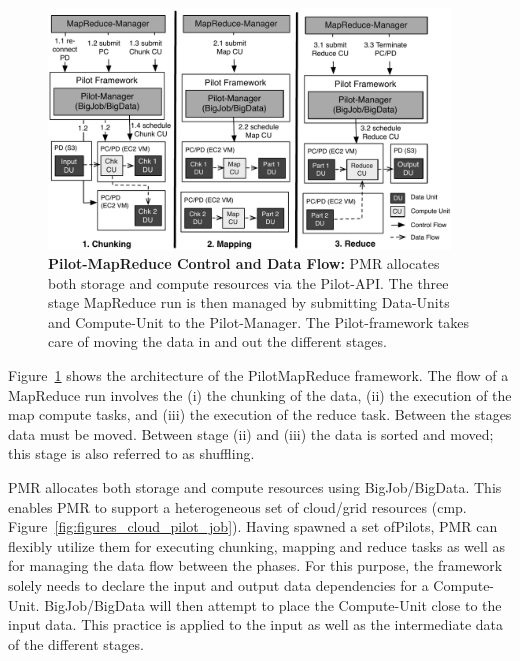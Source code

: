 \documentclass[times]{cpeauth}
\newcommand{\pilot}{Pilot\xspace}
\newcommand{\pilots}{Pilots\xspace}
\newcommand{\pilotmapreduce}{PilotMapReduce\xspace}
\newcommand{\computeunit}{Compute-Unit\xspace}
\newcommand{\dataunits}{Data-Units\xspace}
\begin{document}
\begin{figure}[t]
	\centering
    \includegraphics[width=0.95\textwidth]{figures/pmr_clouds_flow.pdf}
    \caption{\textbf{Pilot-MapReduce Control and Data Flow:} PMR allocates 
     both storage and compute resources via the \pilot-API. The three stage 
    MapReduce run is then managed by submitting \dataunits and \computeunit to 
    the \pilot-Manager. The \pilot-framework takes care of moving the data in 
    and out the different stages.}
	\label{fig:figures_pmr_clouds}
\end{figure}

Figure~\ref{fig:figures_pmr_clouds} shows the architecture of the
\pilotmapreduce framework. The flow of a MapReduce run involves the (i) the 
chunking of the data, (ii) the execution of the map compute tasks, and (iii) 
the execution of the reduce task. Between the stages data must be moved. 
Between stage (ii) and (iii) the data is sorted and moved; this stage is also 
referred to as shuffling.

PMR allocates both storage and compute resources
using BigJob/BigData. This enables PMR to support a heterogeneous set of
cloud/grid resources (cmp. Figure~\ref{fig:figures_cloud_pilot_job}). Having
spawned a set of\pilots, PMR can flexibly utilize them for executing chunking,
mapping and reduce tasks as well as for managing the data flow between the
phases. For this purpose, the framework solely needs to declare the input and
output data dependencies for a \computeunit. BigJob/BigData will then attempt
to place the \computeunit close to the input data. This practice is applied to
the input as well as the intermediate data of the different stages.
\end{document}
